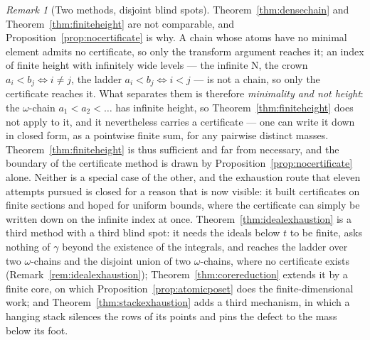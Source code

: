 \documentclass[11pt,a4paper]{article}
\theoremstyle{plain}
\theoremstyle{definition}
\theoremstyle{remark}
\newtheorem{remark}[theorem]{Remark}
\begin{document}
\begin{remark}[Two methods, disjoint blind spots]
  \label{rem:twomethods}
  Theorem~\ref{thm:densechain} and Theorem~\ref{thm:finiteheight} are not
  comparable, and Proposition~\ref{prop:nocertificate} is why.  A chain whose
  atoms have no minimal element admits no certificate, so only the transform
  argument reaches it; an index of finite height with infinitely wide levels ---
  the infinite \textsf{N}, the crown $a_i < b_j \iff i \neq j$, the ladder
  $a_i < b_j \iff i < j$ --- is not a chain, so only the certificate reaches it.
  What separates them is therefore \emph{minimality and not height}: the
  $\omega$-chain $a_1 < a_2 < \dots$ has infinite height, so
  Theorem~\ref{thm:finiteheight} does not apply to it, and it nevertheless
  carries a certificate --- one can write it down in closed form, as a pointwise
  finite sum, for any pairwise distinct masses.  Theorem~\ref{thm:finiteheight}
  is thus sufficient and far from necessary, and the boundary of the certificate
  method is drawn by Proposition~\ref{prop:nocertificate} alone.  Neither is a special case of the
  other, and the exhaustion route that eleven attempts pursued is closed for a
  reason that is now visible: it built certificates on finite sections and hoped
  for uniform bounds, where the certificate can simply be written down on the
  infinite index at once.  Theorem~\ref{thm:idealexhaustion} is a third method
  with a third blind spot: it needs the ideals below $t$ to be finite, asks
  nothing of $\gamma$ beyond the existence of the integrals, and reaches the
  ladder over two $\omega$-chains and the disjoint union of two
  $\omega$-chains, where no certificate exists
  (Remark~\ref{rem:idealexhaustion}); Theorem~\ref{thm:corereduction} extends
  it by a finite core, on which Proposition~\ref{prop:atomicposet} does the
  finite-dimensional work; and Theorem~\ref{thm:stackexhaustion} adds a third
  mechanism, in which a hanging stack silences the rows of its points and pins
  the defect to the mass below its foot.
\end{remark}
\end{document}
